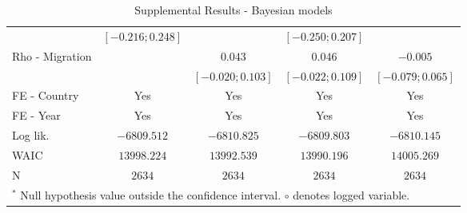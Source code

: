 \begin{sidewaystable}
\begin{center}
{\begin{tabular}{l@{} c@{} c@{} c@{} c@{}}
                                                             & $ [ -0.216;  0.248]$ &                      & $ [ -0.250;  0.207]$ &                      \\
Rho - Migration                                              &                      & $0.043$              & $0.046$              & $-0.005$             \\
                                                             &                      & $ [ -0.020;  0.103]$ & $ [ -0.022;  0.109]$ & $ [ -0.079;  0.065]$ \\
\midrule
FE - Country                                                 & Yes                  & Yes                  & Yes                  & Yes                  \\
FE - Year                                                    & Yes                  & Yes                  & Yes                  & Yes                  \\
Log lik.                                                     & $-6809.512$          & $-6810.825$          & $-6809.803$          & $-6810.145$          \\
WAIC                                                         & $13998.224$          & $13992.539$          & $13990.196$          & $14005.269$          \\
N                                                            & $2634$               & $2634$               & $2634$               & $2634$               \\
\bottomrule
\multicolumn{5}{l}{\scriptsize{$^*$ Null hypothesis value outside the confidence interval.
$\circ$ denotes logged variable.}}
\end{tabular}
}
\caption{Supplemental Results - Bayesian models}
\label{table:regressions-appendix-bayes}
\end{center}
\end{sidewaystable}
